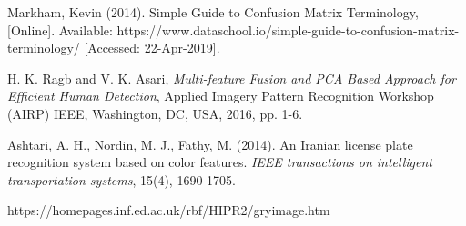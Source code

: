 \begin{thebibliography}{7}
{Markham, Kevin (2014). Simple Guide to Confusion Matrix Terminology, [Online]. Available: https://www.dataschool.io/simple-guide-to-confusion-matrix-terminology/ [Accessed: 22-Apr-2019].}

{H. K. Ragb and V. K. Asari, \emph{Multi-feature Fusion and PCA Based Approach for Efficient Human Detection}, Applied Imagery Pattern Recognition Workshop (AIRP) IEEE, Washington, DC, USA, 2016, pp. 1-6.}

{Ashtari, A. H., Nordin, M. J., Fathy, M. (2014). An Iranian license plate recognition system based on color features. \emph{IEEE transactions on intelligent transportation systems}, 15(4), 1690-1705.}

{https://homepages.inf.ed.ac.uk/rbf/HIPR2/gryimage.htm}


\end{thebibliography}